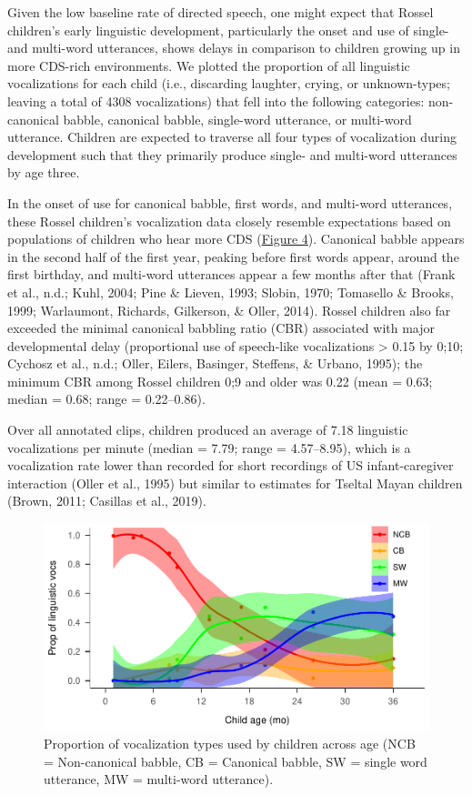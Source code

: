\documentclass[
  english,
  ,man,floatsintext]{apa6}
\begin{document}
Given the low baseline rate of directed speech, one might expect that Rossel children's early linguistic development, particularly the onset and use of single- and multi-word utterances, shows delays in comparison to children growing up in more CDS-rich environments. We plotted the proportion of all linguistic vocalizations for each child (i.e., discarding laughter, crying, or unknown-types; leaving a total of 4308 vocalizations) that fell into the following categories: non-canonical babble, canonical babble, single-word utterance, or multi-word utterance. Children are expected to traverse all four types of vocalization during development such that they primarily produce single- and multi-word utterances by age three.

In the onset of use for canonical babble, first words, and multi-word utterances, these Rossel children's vocalization data closely resemble expectations based on populations of children who hear more CDS (\protect\hyperlink{fig4}{Figure 4}). Canonical babble appears in the second half of the first year, peaking before first words appear, around the first birthday, and multi-word utterances appear a few months after that (Frank et al., n.d.; Kuhl, 2004; Pine \& Lieven, 1993; Slobin, 1970; Tomasello \& Brooks, 1999; Warlaumont, Richards, Gilkerson, \& Oller, 2014). Rossel children also far exceeded the minimal canonical babbling ratio (CBR) associated with major developmental delay (proportional use of speech-like vocalizations \textgreater{} 0.15 by 0;10; Cychosz et al., n.d.; Oller, Eilers, Basinger, Steffens, \& Urbano, 1995); the minimum CBR among Rossel children 0;9 and older was 0.22 (mean = 0.63; median = 0.68; range = 0.22--0.86).

Over all annotated clips, children produced an average of 7.18 linguistic vocalizations per minute (median = 7.79; range = 4.57--8.95), which is a vocalization rate lower than recorded for short recordings of US infant-caregiver interaction (Oller et al., 1995) but similar to estimates for Tseltal Mayan children (Brown, 2011; Casillas et al., 2019).

\begin{figure}
\centering
\includegraphics{Yeli-CLE_files/figure-latex/fig4-1.pdf}
\caption{\label{fig:fig4}Proportion of vocalization types used by children across age (NCB = Non-canonical babble, CB = Canonical babble, SW = single word utterance, MW = multi-word utterance).}
\end{figure}
\end{document}
